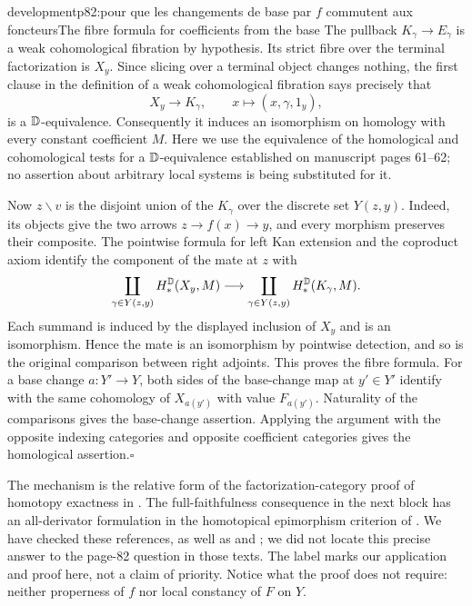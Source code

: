 \begin{dcomment}{development}{p82:pour que les changements de base par $f$ commutent aux foncteurs}{The fibre formula for coefficients from the base}
The pullback $K_\gamma\to E_\gamma$ is a weak cohomological fibration by hypothesis. Its strict fibre over the terminal factorization is $X_y$. Since slicing over a terminal object changes nothing, the first clause in the definition of a weak cohomological fibration says precisely that
\[
 X_y\longrightarrow K_\gamma,
 \qquad x\longmapsto(x,\gamma,1_y),
\]
is a $\mathbb{D}$-equivalence. Consequently it induces an isomorphism on homology with every constant coefficient $M$. Here we use the equivalence of the homological and cohomological tests for a $\mathbb{D}$-equivalence established on manuscript pages 61--62; no assertion about arbitrary local systems is being substituted for it.

Now $z\backslash v$ is the disjoint union of the $K_\gamma$ over the discrete set $Y(z,y)$. Indeed, its objects give the two arrows $z\to f(x)\to y$, and every morphism preserves their composite. The pointwise formula for left Kan extension and the coproduct axiom identify the component of the mate at $z$ with
\[
 \coprod_{\gamma\in Y(z,y)}H_*^{\mathbb{D}}(X_y,M)
 \longrightarrow
 \coprod_{\gamma\in Y(z,y)}H_*^{\mathbb{D}}(K_\gamma,M).
\]
Each summand is induced by the displayed inclusion of $X_y$ and is an isomorphism. Hence the mate is an isomorphism by pointwise detection, and so is the original comparison between right adjoints. This proves the fibre formula. For a base change $a:Y'\to Y$, both sides of the base-change map at $y'\in Y'$ identify with the same cohomology of $X_{a(y')}$ with value $F_{a(y')}$. Naturality of the comparisons gives the base-change assertion. Applying the argument with the opposite indexing categories and opposite coefficient categories gives the homological assertion.\hfill$\square$

The mechanism is the relative form of the factorization-category proof of homotopy exactness in \citet[Theorem 3.8]{GrothPontoShulman2014}. The full-faithfulness consequence in the next block has an all-derivator formulation in the homotopical epimorphism criterion of \citet[Theorem 6.10]{GrothStovicek2016Trees}. We have checked these references, as well as \citet{Maltsiniotis2005Asphericite} and \citet{Cisinski2009LocallyConstant}; we did not locate this precise answer to the page-82 question in those texts. The label marks our application and proof here, not a claim of priority. Notice what the proof does not require: neither properness of $f$ nor local constancy of $F$ on $Y$.
\end{dcomment}



